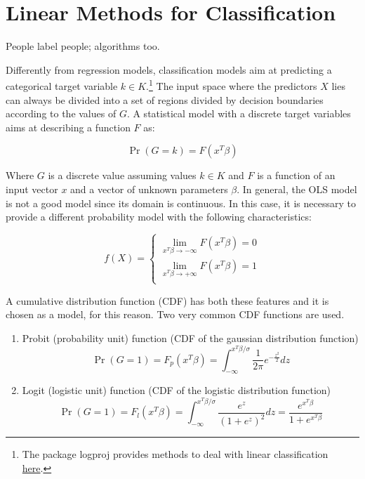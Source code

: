 \chapter{Linear Methods for Classification}{People label people; algorithms too.} \label{chapLinearClassification}

Differently from regression models, classification models aim at predicting a categorical target variable $k\in K$.\footnote{The package logproj provides methods to deal with linear classification \href{https://github.com/aletuf93/logproj/blob/master/logproj/M_learningMethod/linear_models.py}{here}.}  The input space where the predictors $X$ lies can always be divided into a set of regions divided by decision boundaries according to the values of $G$. A statistical model with a discrete target variables aims at describing a function $F$ as:

\begin{equation}
\Pr{(G=k)}=F(x^T\beta)
\label{eq_classification1}
\end{equation}

Where $G$ is a discrete value assuming values $k\in K$ and $F$ is a function of an input vector $x$ and a vector of unknown parameters $\beta$. In general, the OLS model is not a good model since its domain is continuous. In this case, it is necessary to provide a different probability model with the following characteristics:

\begin{equation}
f(X)=\left\{
                \begin{array}{ll}
                  \lim_{x^T\beta \to -\infty} F\left(x^T\beta\right)=0 \\
                  \lim_{x^T\beta \to +\infty} F\left(x^T\beta\right)=1 \\
                \end{array}
              \right.
\label{eq_classification2}
\end{equation}

A cumulative distribution function (CDF) has both these features and it is chosen as a model, for this reason. Two very common CDF functions are used.

\begin{enumerate}
    \item Probit (probability unit) function (CDF of the gaussian distribution function)
    \begin{equation}
        \Pr{\left(G=1\right)}=F_p\left(x^T\beta\right)=\int_{-\infty}^{x^T\beta/\sigma}{\frac{1}{2\pi}e^{-\frac{z^2}{2}}dz}
        \label{eq_probit}
    \end{equation}
    
    \item Logit (logistic unit) function (CDF of the logistic distribution function)
    \begin{equation}
        \Pr{\left(G=1\right)}=F_l\left(x^T\beta\right)=\int_{-\infty}^{x^T\beta/\sigma}{\frac{e^z}{\left(1+e^z\right)^2}dz}=\frac{e^{x^T\beta}}{1+e^{x^T\beta}}
        \label{eq_logit}
    \end{equation}
    
\end{enumerate}

